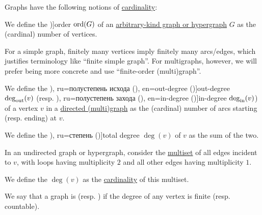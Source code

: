 \begin{definition}\label{def:graph_cardinality}
  Graphs have the following notions of \hyperref[thm:cardinality_existence]{cardinality}:
  \begin{thmenum}
     We define the \term[ru=порядок (\cite[9]{ЕмеличевИПр1990ТеорияГрафов})]{order} \( \operatorname{ord}(G) \) of an \hyperref[rem:arbitrary_kind_graph]{arbitrary-kind graph or hypergraph} \( G \) as the (cardinal) number of vertices.

    For a simple graph, finitely many vertices imply finitely many arcs/edges, which justifies terminology like \enquote{finite simple graph}. For multigraphs, however, we will prefer being more concrete and use \enquote{finite-order (multi)graph}.

    \mimprovised We define the \term[bg=полустепен на изхода (\cite[8]{Мирчев2001Графи}), ru=полустепень исхода (\cite[283]{ЕмеличевИПр1990ТеорияГрафов}), en=out-degree (\cite[def. 1.1.7]{Knauer2019AlgebraicGraphTheory})]{out-degree} \( \deg_{\op{out}}(v) \) (resp. \term[bg=полустепен на входа (\cite[8]{Мирчев2001Графи}), ru=полустепень захода (\cite[283]{ЕмеличевИПр1990ТеорияГрафов}), en=in-degree (\cite[def. 1.1.8]{Knauer2019AlgebraicGraphTheory})]{in-degree} \( \deg_{\op{in}}(v) \)) of a vertex \( v \) in a \hyperref[def:directed_multigraph]{directed (multi)graph} as the (cardinal) number of arcs starting (resp. ending) at \( v \).

    We define the \term[bg=степен (\cite[8]{Мирчев2001Графи}), ru=степень (\cite[283]{ЕмеличевИПр1990ТеорияГрафов})]{total degree} \( \deg(v) \) of \( v \) as the sum of the two.

    \mimprovised In an undirected graph or hypergraph, consider the \hyperref[def:multiset]{multiset} of all edges incident to \( v \), with loops having multiplicity \( 2 \) and all other edges having multiplicity \( 1 \).

    We define the  \( \deg(v) \) as the \hyperref[def:multiset/cardinality]{cardinality} of this multiset.

     We say that a graph is  (resp. ) if the degree of any vertex is finite (resp. countable).
  \end{thmenum}
\end{definition}

